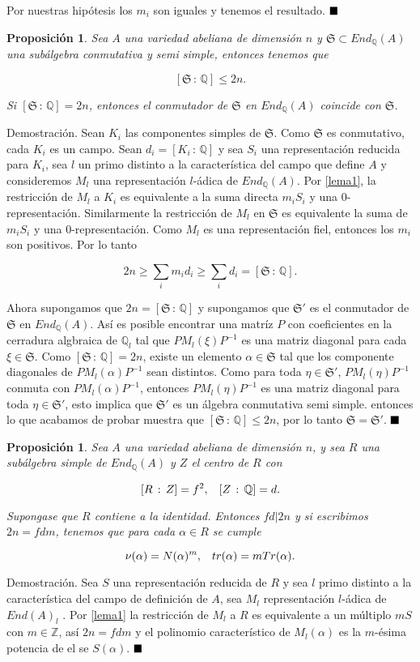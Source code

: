 \documentclass[letterpaper]{report}
\newtheorem{prop}[teorema]{Proposici\'on}
\newcommand{\dem}{{\sc Demostraci\'on. }}
\newcommand{\rac}{\ensuremath{ \mathbb Q }}
\newcommand{\dbz}{\ensuremath{ \mathbb Z }}
\newcommand{\qed}{\ensuremath{\hspace*{0em plus 1fill}\blacksquare}}
\begin{document}
Por nuestras hipótesis los $m_i$ son iguales y tenemos el resultado. \qed
\begin{prop}\label{prop1}
Sea $A$ una variedad abeliana de dimensión $n$ y $\mathfrak{S}\subset End_{\rac}(A)$ una subálgebra conmutativa y semi simple, entonces tenemos que 

$$[\mathfrak{S}\,:\,\rac]\leq 2n.$$

\noindent Si $[\mathfrak{S}\,:\,\rac]=2n$, entonces el conmutador de $\mathfrak{S}$ en $End_{\rac}(A)$ coincide con $\mathfrak{S}$.
\end{prop}
\dem Sean $K_i$ las componentes simples de $\mathfrak{S}$. Como $\mathfrak{S}$ es conmutativo, cada $K_i$ es un campo. Sean $d_i=[K_i\,:\,\rac]$ y sea $S_i$ una representación reducida para $K_i$, sea $l$ un primo distinto a la característica del campo que define $A$ y consideremos $M_l$ una representación $l$-ádica de $End_{\rac}(A)$. Por \ref{lema1}, la restricción de $M_l$ a $K_i$ es equivalente a la suma directa $m_i S_i$ y una $0$-representación. Similarmente la restricción de $M_l$ en $\mathfrak{S}$ es equivalente la suma de $m_i S_i$ y una $0$-representación. Como $M_l$ es una representación fiel, entonces los $m_i$ son positivos. Por lo tanto 

$$2n\geq\sum_{i}m_i d_i\geq\sum_{i}d_i=[\mathfrak{S}\,:\,\rac].$$

Ahora supongamos que $2n=[\mathfrak{S}\,:\,\rac]$ y supongamos que $\mathfrak{S}'$ es el conmutador de $\mathfrak{S}$ en $End_{\rac}(A)$. Así es posible encontrar una matríz $P$ con coeficientes en la cerradura algbraica de $\rac_l$ tal que $PM_l(\xi)P^{-1}$ es una matriz diagonal para cada $\xi\in\mathfrak{S}$. Como $[\mathfrak{S}\,:\,\rac]=2n$, existe un elemento $\alpha\in\mathfrak{S}$ tal que los componente diagonales de $PM_l(\alpha)P^{-1}$ sean distintos. Como para toda $\eta\in\mathfrak{S}'$, $PM_l(\eta)P^{-1}$ conmuta con $PM_l(\alpha)P^{-1}$, entonces $PM_l(\eta)P^{-1}$ es una matriz diagonal para toda $\eta\in\mathfrak{S}'$, esto implica que $\mathfrak{S}'$ es un álgebra conmutativa semi simple. entonces lo que acabamos de probar muestra que $[\mathfrak{S}\,:\,\rac]\leq2n$, por lo tanto  $\mathfrak{S}=\mathfrak{S}'$. \qed
\begin{prop}\label{prop2}
Sea $A$ una variedad abeliana de dimensión $n$, y sea $R$ una subálgebra simple de $End_{\rac}(A)$ y $Z$ el centro de $R$ con

$$[R\,:\,Z ]=f^2,\hspace{0.3cm}[Z\,:\,\rac]=d.$$

\noindent Supongase que $R$ contiene a la identidad. Entonces $fd|2n$ y si escribimos $2n=fdm$, tenemos que para cada $\alpha\in R$ se cumple

$$\nu(\alpha)=N(\alpha)^m,\hspace{0.3cm}tr(\alpha)=mTr(\alpha).$$
\end{prop}
\dem Sea $S$ una representación reducida de $R$ y sea $l$ primo distinto a la característica del campo de definición de $A$, sea $M_l$ representación $l$-ádica de $End(A)_l$ . Por \ref{lema1} la restricción de $M_l$ a $R$ es equivalente a un múltiplo  $mS$ con $m\in\dbz$, así $2n=fdm$ y el polinomio característico de $M_l(\alpha)$ es la $m$-ésima potencia de el se $S(\alpha)$. \qed
\end{document}

